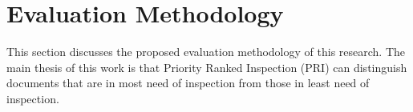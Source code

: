 

\chapter{Evaluation Methodology}
This section discusses the proposed evaluation methodology of this
research. The main thesis of this work is that Priority Ranked Inspection
(PRI) can distinguish documents that are in most need of inspection from
those in least need of inspection.